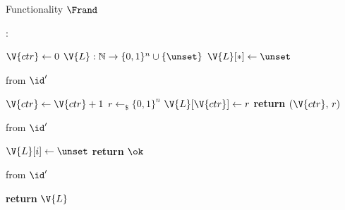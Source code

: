 \begin{interface}[nofloat]{Functionality $\Frand$ \\
}

{\scriptsize
\setlength{\columnsep}{1.4em}
\begin{multicols}{2}
:
\begin{algorithmic}[1]
\setcounter{contline}{0}\algcont
\State $\V{ctr} \gets 0$
\State $\V{L} : \mathbb{N} \to \{0,1\}^{n} \cup \{\unset\}$
\State $\V{L}[*] \gets \unset$
\algsave
\end{algorithmic}
\vspace{1.4ex}

 \quad from $\id'$
\begin{algorithmic}[1]
\algcont
\State $\V{ctr} \gets \V{ctr} + 1$
\State $r \gets_{\$} \{0,1\}^{n}$ \label{ln:rndsample}
\State $\V{L}[\V{ctr}] \gets r$
\State \textbf{return} $(\V{ctr},\, r)$ \label{ln:rndreturn}
\algsave
\end{algorithmic}
\vspace{1.4ex}

\columnbreak

 \quad from $\id'$
\begin{algorithmic}[1]
\algcont
\State $\V{L}[i] \gets \unset$ \label{ln:rnderase}
\State \textbf{return} $\ok$
\algsave
\end{algorithmic}
\vspace{1.4ex}

 \quad from $\id'$
\begin{algorithmic}[1]
\algcont
\State \textbf{return} $\V{L}$
\algsave
\end{algorithmic}
\end{multicols}}
\end{interface}
